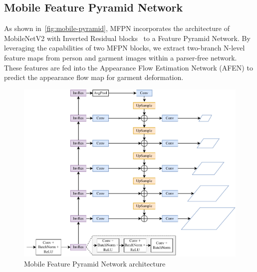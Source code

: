 \subsection{Mobile Feature Pyramid Network}
As shown in~\autoref{fig:mobile-pyramid}, MFPN incorporates the architecture of MobileNetV2 with Inverted Residual blocks~\cite{Sandler-CVPR2018-Mobilenetv2} to a Feature Pyramid Network. By leveraging the capabilities of two MFPN blocks, we extract two-branch N-level feature maps from person and garment images within a parser-free network. These features are fed into the Appearance Flow Estimation Network (AFEN) to predict the appearance flow map for garment deformation.

\begin{figure}[h!]
  \centering
  \includegraphics[width=\linewidth]{content/resources/images/tryon/mobile-pyramid.pdf}
  \caption{Mobile Feature Pyramid Network architecture}
  \label{fig:mobile-pyramid}
  \vspace{-2mm}
\end{figure}


